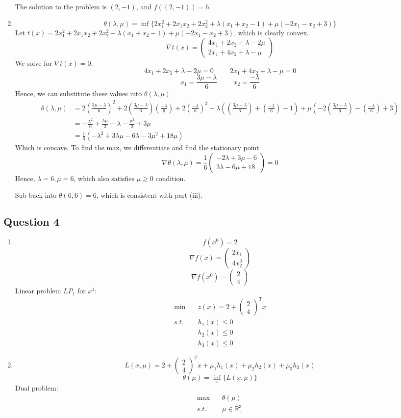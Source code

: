 \documentclass{article}
\newcommand{\R}{\mathbb{R}}
\newcommand{\vv}[2]{\begin{pmatrix}#1\\#2\end{pmatrix}}
\begin{document}
\begin{enumerate}[label=(\roman*)]
    The solution to the problem is $(2,-1)$, and $f((2,-1)) = 6$.
\item
    \[
    \theta(\lambda,\mu) = \inf\{2x_1^2 + 2x_1x_2 + 2x_2^2 + \lambda (x_1+x_2-1) + \mu (-2x_1 - x_2 + 3)\}
    \]
    Let $t(x) = 2x_1^2 + 2x_1x_2 + 2x_2^2 + \lambda (x_1+x_2-1) + \mu (-2x_1 - x_2 + 3)$, which is clearly convex.
    \[
    \nabla t(x) = \vv{4x_1+2x_2+\lambda-2\mu}{2x_1+4x_2+\lambda-\mu}
    \]
    We solve for $\nabla t(x)=0$,
    \[4x_1+2x_2+\lambda-2\mu=0 \hspace{1cm} 2x_1+4x_2+\lambda-\mu=0\]
    \[x_1 = \frac{3\mu - \lambda}{6} \hspace{1cm} x_2 = \frac{-\lambda}{6}\]
    Hence, we can substitute these values into $\theta(\lambda,\mu)$
    \begin{align*}
    \theta(\lambda,\mu) &= 2(\frac{3\mu - \lambda}{6})^2 + 2(\frac{3\mu - \lambda}{6})(\frac{-\lambda}{6}) + 2(\frac{-\lambda}{6})^2 + \lambda ((\frac{3\mu - \lambda}{6})+(\frac{-\lambda}{6})-1) + \mu (-2(\frac{3\mu - \lambda}{6}) - (\frac{-\lambda}{6}) + 3) \\
        &= -\frac{\lambda^2}{6} + \frac{\lambda \mu}{2} - \lambda - \frac{\mu^2}{2} + 3\mu \\
        &= \frac{1}{6}(-\lambda^2 + 3\lambda\mu - 6\lambda - 3\mu^2 + 18\mu)
    \end{align*}
    Which is concave. To find the max, we differentiate and find the stationary point
    \[\nabla \theta(\lambda,\mu) = \frac{1}{6} \vv{-2\lambda + 3\mu - 6}{3\lambda - 6\mu + 18}=0\]
    Hence, $\lambda=6, \mu=6$, which also satisfies $\mu \geq 0$ condition.
    
    Sub back into $\theta(6, 6) = 6$, which is consistent with part (iii).
\end{enumerate}

\subsection*{Question 4}

\begin{enumerate}[label=(\roman*)]
\item
    \[f(x^0) = 2\]
    \[\nabla f(x) = \vv{2x_1}{4x_2^3}\]
    \[\nabla f(x^0) = \vv{2}{4}\]
    Linear problem $LP_1$ for $x^1$:
    \begin{align*}
    \min \quad & z(x) = 2 + \vv{2}{4}^Tx \\
    s.t. \quad & h_1(x) \leq 0 \\
    & h_2(x) \leq 0 \\
    & h_3(x) \leq 0
    \end{align*}
\item
    \[L(x,\mu) = 2 + \vv{2}{4}^Tx + \mu_1 h_1(x) + \mu_2 h_2(x) + \mu_3 h_3(x)\]
    \[\theta(\mu) = \inf_{x} \{L(x,\mu)\}\]
    Dual problem:
    \begin{align*}
    \max \quad & \theta(\mu) \\
    s.t. \quad & \mu \in \R_+^3
    \end{align*}
\end{enumerate}
\end{document}
